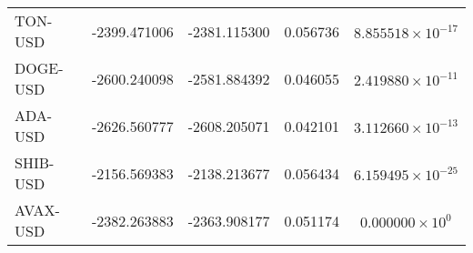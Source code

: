 \documentclass{ledger}
\begin{document}
\begin{table}[h]
\begin{tabular}{|l|c|c|c|c|}
TON-USD & -2399.471006 & -2381.115300 & 0.056736 & $8.855518 \times 10^{-17}$ \\
DOGE-USD & -2600.240098 & -2581.884392 & 0.046055 & $2.419880 \times 10^{-11}$ \\
ADA-USD & -2626.560777 & -2608.205071 & 0.042101 & $3.112660 \times 10^{-13}$ \\
SHIB-USD & -2156.569383 & -2138.213677 & 0.056434 & $6.159495 \times 10^{-25}$ \\
AVAX-USD & -2382.263883 & -2363.908177 & 0.051174 & $0.000000 \times 10^{0}$ \\
\hline
\end{tabular}
\end{table}


\thispagestyle{pagelast}





\end{document}
